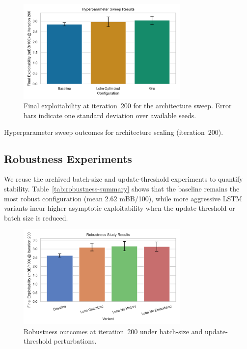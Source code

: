 \documentclass[11pt]{article}
\begin{document}
\begin{figure}[H]
    \centering
    \includegraphics[width=0.75\textwidth]{figures/hyperparameter_sweep_summary.png}
    \caption{Final exploitability at iteration~200 for the architecture sweep. Error bars indicate one standard deviation over available seeds.}
    \label{fig:hyperparameter-summary}
\end{figure}

\begin{table}[H]
    \centering
    \caption{Hyperparameter sweep outcomes for architecture scaling (iteration~200).}
    \label{tab:hyperparameter-summary}
    
\end{table}

\subsection{Robustness Experiments}
We reuse the archived batch-size and update-threshold experiments to quantify stability. Table~\ref{tab:robustness-summary} shows that the baseline remains the most robust configuration (mean $2.62$ mBB/100), while more aggressive LSTM variants incur higher asymptotic exploitability when the update threshold or batch size is reduced.

\begin{figure}[H]
    \centering
    \includegraphics[width=0.75\textwidth]{figures/robustness_summary.png}
    \caption{Robustness outcomes at iteration~200 under batch-size and update-threshold perturbations.}
    \label{fig:robustness-summary}
\end{figure}
\end{document}
